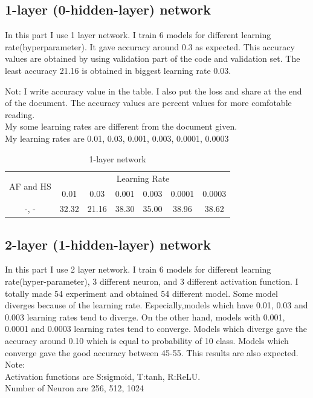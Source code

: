 \documentclass{article}
\begin{document}
\subsection{1-layer (0-hidden-layer) network}

In this part I use 1 layer network. I train 6 models for different learning rate(hyperparameter). It gave accuracy around 0.3  as expected. This accuracy values are obtained by using validation part of the code and validation set.  The least accuracy 21.16 is obtained in biggest learning rate 0.03. 

Not: I write accuracy value in the table. I also put the loss and share at the end of the document. The accuracy values are percent values for more comfotable reading.\\

My some learning rates are different from the document given. \\

My learning rates are   0.01, 0.03, 0.001, 0.003, 0.0001, 0.0003 \\



\begin{table}[htbp]
    \centering
    \begin{tabular}{|c|c|c|c|c|c|c|}
    \hline
    \multirow{2}{5em}{AF and HS} & \multicolumn{6}{c|}{Learning Rate} \\
        & 0.01 & 0.03 & 0.001 & 0.003 & 0.0001 & 0.0003 \\
        \hline \hline
        -, -  & 32.32 & 21.16 & 38.30 & 35.00 & 38.96 & 38.62 \\
        \hline
    \end{tabular}
    \caption{1-layer network}
    \label{tab:1layer}
\end{table}


\newpage
\subsection{2-layer (1-hidden-layer) network}

In this part I use 2 layer network. I train 6 models for different learning rate(hyper-parameter), 3 different neuron, and 3 different activation function. I totally made 54 experiment and obtained 54 different model. Some model diverges because of the learning rate. Especially,models which have 0.01, 0.03 and 0.003 learning rates tend to diverge. On the other hand, models with 0.001, 0.0001 and 0.0003 learning rates tend to converge. Models which diverge gave the accuracy around 0.10 which is equal to probability of 10 class. Models which converge gave the good accuracy between 45-55. This results are also expected.\\
Note:\\
Activation functions are S:sigmoid, T:tanh, R:ReLU.\\
Number of Neuron are 256, 512, 1024 \\
\end{document}
